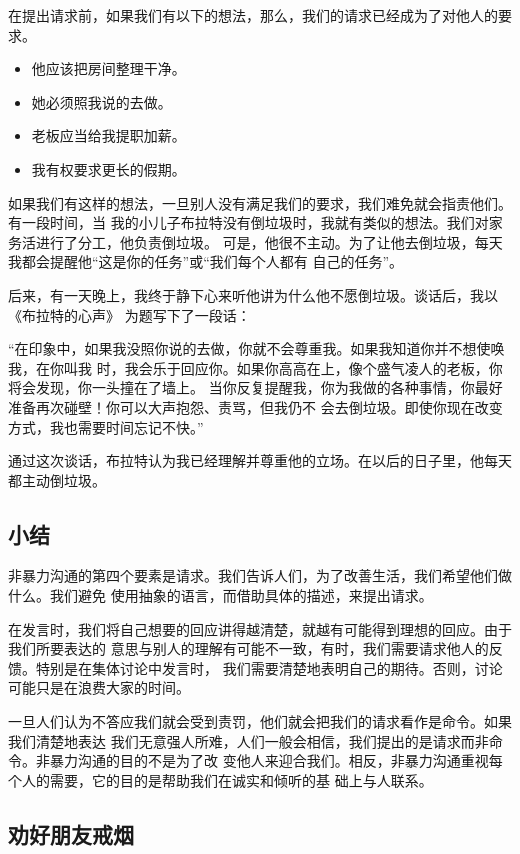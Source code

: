 \documentclass{ctexart}
\begin{document}
在提出请求前，如果我们有以下的想法，那么，我们的请求已经成为了对他人的要求。

\begin{itemize}
	\item 他应该把房间整理干净。
	\item 她必须照我说的去做。
	\item 老板应当给我提职加薪。
	\item 我有权要求更长的假期。
\end{itemize}

如果我们有这样的想法，一旦别人没有满足我们的要求，我们难免就会指责他们。有一段时间，当
我的小儿子布拉特没有倒垃圾时，我就有类似的想法。我们对家务活进行了分工，他负责倒垃圾。
可是，他很不主动。为了让他去倒垃圾，每天我都会提醒他``这是你的任务''或``我们每个人都有
自己的任务''。

后来，有一天晚上，我终于静下心来听他讲为什么他不愿倒垃圾。谈话后，我以《布拉特的心声》
为题写下了一段话：

``在印象中，如果我没照你说的去做，你就不会尊重我。如果我知道你并不想使唤我，在你叫我
时，我会乐于回应你。如果你高高在上，像个盛气凌人的老板，你将会发现，你一头撞在了墙上。
当你反复提醒我，你为我做的各种事情，你最好准备再次碰壁！你可以大声抱怨、责骂，但我仍不
会去倒垃圾。即使你现在改变方式，我也需要时间忘记不快。''

通过这次谈话，布拉特认为我已经理解并尊重他的立场。在以后的日子里，他每天都主动倒垃圾。

\subsection{小结}

非暴力沟通的第四个要素是请求。我们告诉人们，为了改善生活，我们希望他们做什么。我们避免
使用抽象的语言，而借助具体的描述，来提出请求。

在发言时，我们将自己想要的回应讲得越清楚，就越有可能得到理想的回应。由于我们所要表达的
意思与别人的理解有可能不一致，有时，我们需要请求他人的反馈。特别是在集体讨论中发言时，
我们需要清楚地表明自己的期待。否则，讨论可能只是在浪费大家的时间。

一旦人们认为不答应我们就会受到责罚，他们就会把我们的请求看作是命令。如果我们清楚地表达
我们无意强人所难，人们一般会相信，我们提出的是请求而非命令。非暴力沟通的目的不是为了改
变他人来迎合我们。相反，非暴力沟通重视每个人的需要，它的目的是帮助我们在诚实和倾听的基
础上与人联系。

\subsection{劝好朋友戒烟}
\end{document}
